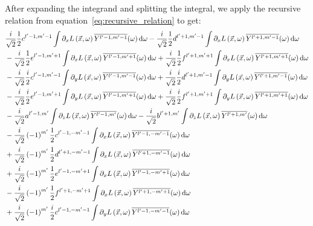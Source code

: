 \documentclass[10pt]{scrartcl}
\begin{document}
After expanding the integrand and splitting the integral, we apply the recursive relation from equation~\ref{eq:recursive_relation} to get:
\begin{align*}
&
\frac{i}{\sqrt{2}}\frac{1}{2}c^{{l'-1,m'-1}}\int{\partial_xL\left (\vec{x} ,\omega \right )\overline{Y^{l'-1, m'-1}}(\omega )\ud\omega}
-\frac{i}{\sqrt{2}}\frac{1}{2}d^{{l'+1,m'-1}}\int{\partial_xL\left (\vec{x} ,\omega \right )\overline{Y^{l'+1, m'-1}}(\omega )\ud\omega}
\\&
-\frac{i}{\sqrt{2}}\frac{1}{2}e^{{l'-1,m'+1}}\int{\partial_xL\left (\vec{x} ,\omega \right )\overline{Y^{l'-1, m'+1}}(\omega )\ud\omega}
+\frac{i}{\sqrt{2}}\frac{1}{2}f^{{l'+1,m'+1}}\int{\partial_xL\left (\vec{x} ,\omega \right )\overline{Y^{l'+1, m'+1}}(\omega )\ud\omega}
\\&
-\frac{i}{\sqrt{2}}\frac{i}{2}c^{{l'-1,m'-1}}\int{\partial_yL\left (\vec{x} ,\omega \right )\overline{Y^{l'-1, m'-1}}(\omega )\ud\omega}
+\frac{i}{\sqrt{2}}\frac{i}{2}d^{{l'+1,m'-1}}\int{\partial_yL\left (\vec{x} ,\omega \right )\overline{Y^{l'+1, m'-1}}(\omega )\ud\omega}
\\&
-\frac{i}{\sqrt{2}}\frac{i}{2}e^{{l'-1,m'+1}}\int{\partial_yL\left (\vec{x} ,\omega \right )\overline{Y^{l'-1, m'+1}}(\omega )\ud\omega}
+\frac{i}{\sqrt{2}}\frac{i}{2}f^{{l'+1,m'+1}}\int{\partial_yL\left (\vec{x} ,\omega \right )\overline{Y^{l'+1, m'+1}}(\omega )\ud\omega}
\\&
-\frac{i}{\sqrt{2}}a^{{l'-1,m'}}\int{\partial_zL\left (\vec{x} ,\omega \right )\overline{Y^{l'-1, m'}}(\omega )\ud\omega}
-\frac{i}{\sqrt{2}}b^{{l'+1,m'}}\int{\partial_zL\left (\vec{x} ,\omega \right )\overline{Y^{l'+1, m'}}(\omega )\ud\omega}
\\&
-\frac{i}{\sqrt{2}}\left({-1}\right)^{m'}\frac{1}{2}c^{{l'-1,-m'-1}}\int{\partial_xL\left (\vec{x} ,\omega \right )\overline{Y^{l'-1, -m'-1}}(\omega )\ud\omega}
\\&
+\frac{i}{\sqrt{2}}\left({-1}\right)^{m'}\frac{1}{2}d^{{l'+1,-m'-1}}\int{\partial_xL\left (\vec{x} ,\omega \right )\overline{Y^{l'+1, -m'-1}}(\omega )\ud\omega}
\\&
+\frac{i}{\sqrt{2}}\left({-1}\right)^{m'}\frac{1}{2}e^{{l'-1,-m'+1}}\int{\partial_xL\left (\vec{x} ,\omega \right )\overline{Y^{l'-1, -m'+1}}(\omega )\ud\omega}
\\&
-\frac{i}{\sqrt{2}}\left({-1}\right)^{m'}\frac{1}{2}f^{{l'+1,-m'+1}}\int{\partial_xL\left (\vec{x} ,\omega \right )\overline{Y^{l'+1, -m'+1}}(\omega )\ud\omega}
\\&
+\frac{i}{\sqrt{2}}\left({-1}\right)^{m'}\frac{i}{2}c^{{l'-1,-m'-1}}\int{\partial_yL\left (\vec{x} ,\omega \right )\overline{Y^{l'-1, -m'-1}}(\omega )\ud\omega}

\end{align*}
\end{document}
